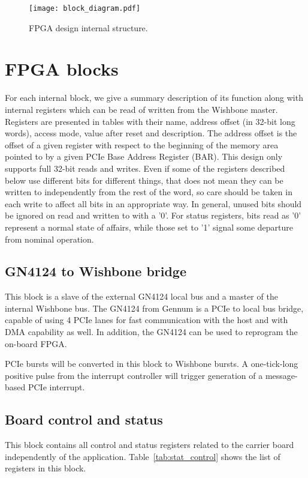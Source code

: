 \documentclass{article}
\begin{document}
\begin{figure}[htbp]
  \centering
  \texttt{[image: block\_diagram.pdf]}
  \caption{FPGA design internal structure.}
  \label{fig:block_diagram}
\end{figure}

\section{FPGA blocks}
For each internal block, we give a summary description of its function along with internal registers which can be read of written from the Wishbone master. Registers are presented in tables with their name, address offset (in 32-bit long words), access mode, value after reset and description. The address offset is the offset of a given register with respect to the beginning of the memory area pointed to by a given PCIe Base Address Register (BAR). This design only supports full 32-bit reads and writes. Even if some of the registers described below use different bits for different things, that does not mean they can be written to independently from the rest of the word, so care should be taken in each write to affect all bits in an appropriate way. In general, unused bits should be ignored on read and written to with a '0'. For status registers, bits read as '0' represent a normal state of affairs, while those set to '1' signal some departure from nominal operation.

\subsection{GN4124 to Wishbone bridge}
This block is a slave of the external GN4124 local bus and a master of the internal Wishbone bus. The GN4124 from Gennum is a PCIe to local bus bridge, capable of using 4 PCIe lanes for fast communication with the host and with DMA capability as well. In addition, the GN4124 can be used to reprogram the on-board FPGA. 

PCIe bursts will be converted in this block to Wishbone bursts. A one-tick-long positive pulse from the interrupt controller will trigger generation of a message-based PCIe interrupt.

\subsection{Board control and status}
This block contains all control and status registers related to the carrier board independently of the application. Table~\ref{tab:stat_control} shows the list of registers in this block.
\end{document}
